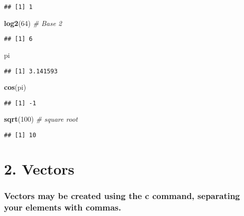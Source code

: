 \documentclass[]{article}
\newenvironment{Shaded}{\begin{snugshade}}{\end{snugshade}}
\newcommand{\KeywordTok}[1]{\textcolor[rgb]{0.13,0.29,0.53}{\textbf{#1}}}
\newcommand{\DecValTok}[1]{\textcolor[rgb]{0.00,0.00,0.81}{#1}}
\newcommand{\CommentTok}[1]{\textcolor[rgb]{0.56,0.35,0.01}{\textit{#1}}}
\newcommand{\NormalTok}[1]{#1}
\begin{document}
\begin{verbatim}
## [1] 1
\end{verbatim}

\begin{Shaded}
\begin{Highlighting}[]
\KeywordTok{log2}\NormalTok{(}\DecValTok{64}\NormalTok{) }\CommentTok{# Base 2}
\end{Highlighting}
\end{Shaded}

\begin{verbatim}
## [1] 6
\end{verbatim}

\begin{Shaded}
\begin{Highlighting}[]
\NormalTok{pi}
\end{Highlighting}
\end{Shaded}

\begin{verbatim}
## [1] 3.141593
\end{verbatim}

\begin{Shaded}
\begin{Highlighting}[]
\KeywordTok{cos}\NormalTok{(pi)}
\end{Highlighting}
\end{Shaded}

\begin{verbatim}
## [1] -1
\end{verbatim}

\begin{Shaded}
\begin{Highlighting}[]
\KeywordTok{sqrt}\NormalTok{(}\DecValTok{100}\NormalTok{) }\CommentTok{# square root}
\end{Highlighting}
\end{Shaded}

\begin{verbatim}
## [1] 10
\end{verbatim}

\section{\texorpdfstring{\textbf{2.
Vectors}}{2. Vectors}}\label{vectors}

\subsubsection{Vectors may be created using the c command, separating
your elements with
commas.}\label{vectors-may-be-created-using-the-c-command-separating-your-elements-with-commas.}
\end{document}
